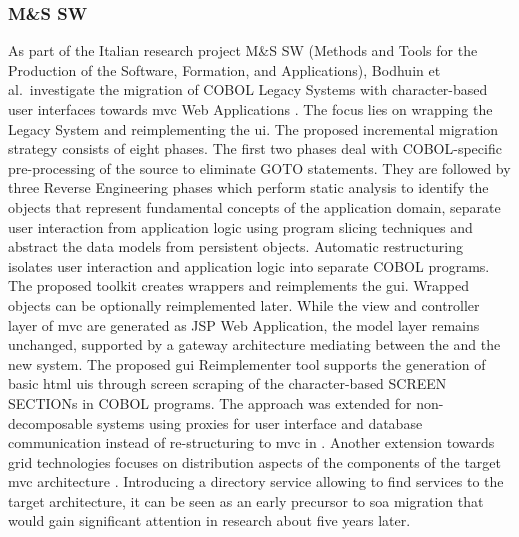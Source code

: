 \vspace{-10pt}
\hypertarget{ms-sw}{%
\subsubsection*{M\&S SW}\label{ms-sw}}

As part of the Italian research project M\&S SW (Methods and Tools for the Production of the Software, Formation, and Applications), Bodhuin et al.~investigate the migration of COBOL \glspl{Legacy System} with character-based user interfaces towards \gls{mvc} \glspl{Web Application} \autocite{Bodhuin2002DesktopWebMVC,Bodhuin2003,Bodhuin2004}.
The focus lies on wrapping the \gls{Legacy System} and reimplementing the \gls{ui}.
The proposed incremental migration strategy \autocite{Bodhuin2002DesktopWebMVC} consists of eight phases.
The first two phases deal with COBOL-specific pre-processing of the  source to eliminate GOTO statements.
They are followed by three \gls{Reverse Engineering} phases which perform static analysis to identify the objects that represent fundamental concepts of the application domain, separate user interaction from application logic using program slicing techniques and abstract the data models from persistent objects.
Automatic restructuring isolates user interaction and application logic into separate COBOL programs.
The proposed toolkit creates wrappers and reimplements the \gls{gui}. Wrapped objects can be optionally reimplemented later.
While the view and controller layer of \gls{mvc} are generated as JSP \gls{Web Application}, the model layer remains unchanged, supported by a gateway architecture mediating between the  and the new system.
The proposed \gls{gui} Reimplementer tool supports the generation of basic \gls{html} \glspl{ui} through screen scraping \autocite{Merlo1995ScreenScraping} of the character-based SCREEN SECTIONs in  COBOL programs.
The approach was extended for non-decomposable systems using proxies for user interface and database communication instead of re-structuring to \gls{mvc} in \autocite{Bodhuin2003}.
Another extension towards grid technologies focuses on distribution aspects of the components of the target \gls{mvc} architecture \autocite{Bodhuin2004}.
Introducing a directory service allowing to find  services to the target architecture, it can be seen as an early precursor to \gls{soa} migration that would gain significant attention in research about five years later.

